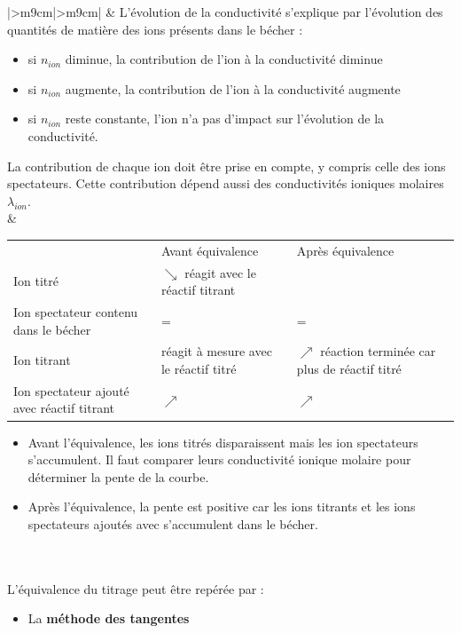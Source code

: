 \documentclass[a4paper,11pt,fleqn]{article}%
\begin{document}
\begin{xtabular}{|>{\centering}m{9cm}|>{\centering\arraybackslash}m{9cm}|}
	\hline
	& L'évolution de la conductivité s'explique par l'évolution des quantités de matière des ions présents dans le bécher :
	\begin{itemize}
		\item si $n_{ion}$ diminue, la contribution de l'ion à la conductivité diminue
		\item si $n_{ion}$ augmente, la contribution de l'ion à la conductivité augmente
		\item si $n_{ion}$ reste constante, l'ion n'a pas d'impact sur l'évolution de la conductivité.
	\end{itemize}
	La contribution de chaque ion doit être prise en compte, y compris celle des ions spectateurs. Cette contribution dépend aussi des conductivités ioniques molaires $\lambda_{ion}$.\\
	& \begin{tabular}{|>{\centering}m{2.3cm}|>{\centering}m{2.3cm}|>{\centering\arraybackslash}m{2.3cm}|}
		\hline
		\multicolumn{3}{|c|}{Évolution des quantités de matière}\\
		\hline
		& Avant équivalence & Après équivalence\\
		\hline
		Ion titré & $\searrow$ réagit avec le réactif titrant & 0\\
		\hline
		Ion spectateur contenu dans le bécher & = & =\\
		\hline
		Ion titrant & 0 réagit à mesure avec le réactif titré & $\nearrow$ réaction terminée car plus de réactif titré\\
		\hline
		Ion spectateur ajouté avec réactif titrant & $\nearrow$ & $\nearrow$\\
		\hline
		\end{tabular}
		\begin{itemize}
			\item Avant l'équivalence, les ions titrés disparaissent mais les ion spectateurs s'accumulent. Il faut comparer leurs conductivité ionique molaire pour déterminer la pente de la courbe.
			\item Après l'équivalence, la pente est positive car les ions titrants et les ions spectateurs ajoutés avec s'accumulent dans le bécher.
		\end{itemize}\\
		\hline
		 \\
	\hline
	L'équivalence du titrage peut être repérée par :
	\begin{itemize}
		\item La \textbf{méthode des tangentes}

\end{itemize}
\end{xtabular}
\end{document}
